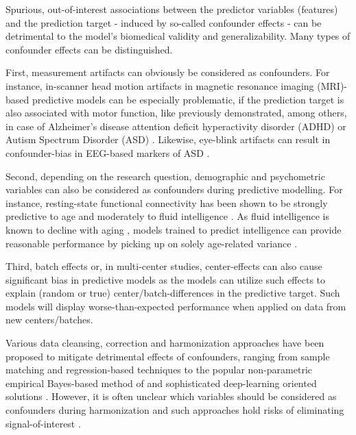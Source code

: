 \documentclass{article}
\begin{document}
Spurious, out-of-interest associations between the predictor variables (features) and the prediction target - induced by so-called confounder effects - can be detrimental to the model's biomedical validity and generalizability. Many types of confounder effects can be distinguished.

First, measurement artifacts can obviously be considered as confounders. For instance, in-scanner head motion artifacts in magnetic resonance imaging (MRI)-based predictive models can be especially problematic, if the prediction target is also associated with motor function, like previously demonstrated, among others, in case of Alzheimer's disease \citep{rao2017predictive} attention deficit hyperactivity disorder (ADHD) \citep{couvy2016head, eloyan2012automated} or Autism Spectrum Disorder (ASD) \citep{spisak2014voxel, spisak2019optimal, gotts2013perils}. Likewise, eye-blink artifacts can result in confounder-bias in EEG-based markers of ASD  \citep{eldridge2014robust}.

Second, depending on the research question, demographic and psychometric variables can also be considered as confounders during predictive modelling. For instance, resting-state functional connectivity has been shown to be strongly predictive to age \citep{wang2012decoding, dukart2011age} and moderately to fluid intelligence \citep{he2020deep, cole2012global}. As fluid intelligence is known to decline with aging \citep{kievit2018neural}, models trained to predict intelligence can provide reasonable performance by picking up on solely age-related variance \citep{lohmann2021predicting, dubois2018distributed}. 

Third, batch effects or, in multi-center studies, center-effects can also cause significant bias in predictive models \citep{leek2010tackling, da2020performance} as the models can utilize such effects to explain (random or true) center/batch-differences in the predictive target. Such models will display worse-than-expected performance when applied on data from new centers/batches.

Various data cleansing, correction and harmonization approaches have been proposed to mitigate detrimental effects of confounders, ranging from sample matching \citep{rao2017predictive} and regression-based techniques \citep{rao2017predictive, dukart2011age, spisak2014voxel, abdulkadir2014reduction} to the popular non-parametric empirical Bayes-based method of \cite{johnson2007adjusting} and sophisticated deep-learning oriented solutions \citep{zhao2020training, hognon2019standardization}. However, it is often unclear which variables should be considered as confounders during harmonization and such approaches hold risks of eliminating signal-of-interest \citep{wachinger2021detect}.
\end{document}
